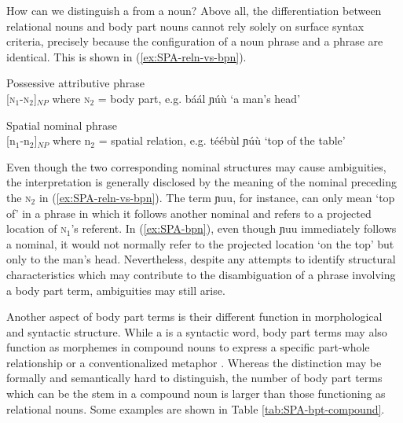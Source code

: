 \begin{exe}
\begin{exe}
\begin{exe}
\begin{exe}
\begin{exe}
\begin{exe}
\begin{exe}
\begin{exe}
\begin{table}
\end{table} 





How can we distinguish a  from a noun?  Above all,  the differentiation between relational nouns and body part nouns cannot rely solely on surface syntax criteria, precisely because the configuration of a  noun phrase and a  phrase are identical. This is shown in (\ref{ex:SPA-reln-vs-bpn}). 

 
\ea\label{ex:SPA-reln-vs-bpn}
\ea\label{ex:SPA-bpn}{\rm Possessive attributive phrase}\\
 {\rm {[\textsc{n}$_{1}$-\textsc{n}$_{2}$]}$_{NP}$ where \textsc{n}$_{2}$ = body 
part,   e.g. {\sls báál  ɲúù} {\rm `a man's head'}}

\ex\label{ex:SPA-reln}{\rm Spatial nominal  phrase}\\
 {\rm {[{\sc n}$_{1}$-{\sc n}$_{2}$]}$_{NP}$ where {\sc n}$_{2}$ = spatial relation,   
e.g. {\sls téébùl  ɲúù}  {\rm  `top of the table'}}
\z
\z

Even though the two corresponding nominal structures may cause ambiguities, the interpretation is generally disclosed by the meaning of the nominal preceding the \textsc{n}$_{2}$ in  (\ref{ex:SPA-reln-vs-bpn}). The term  {\sls  ɲuu}, for instance, can only mean `top of' in a phrase in which it follows another nominal and refers to a projected location of \textsc{n}$_{1}$'s referent. In (\ref{ex:SPA-bpn}), even though {\sls ɲuu} immediately follows a nominal,  it would not normally refer to the projected location `on the top' but only to the man's head. Nevertheless, despite any attempts to identify  structural characteristics which may contribute to the disambiguation of a phrase involving a body part term,  ambiguities may still arise.


Another aspect of body part terms is their different function in  morphological and syntactic structure. While a  is a syntactic word,  body part terms may also function as morphemes in compound nouns to express a specific part-whole relationship or a conventionalized metaphor \citep[141]{Hein97}. Whereas the distinction may be formally and semantically hard to distinguish, the number of body part terms which can be the stem in a compound noun is larger than those functioning as relational nouns. Some examples are shown in Table \ref{tab:SPA-bpt-compound}.


\end{exe}
\end{exe}
\end{exe}
\end{exe}
\end{exe}
\end{exe}
\end{exe}
\end{exe}

